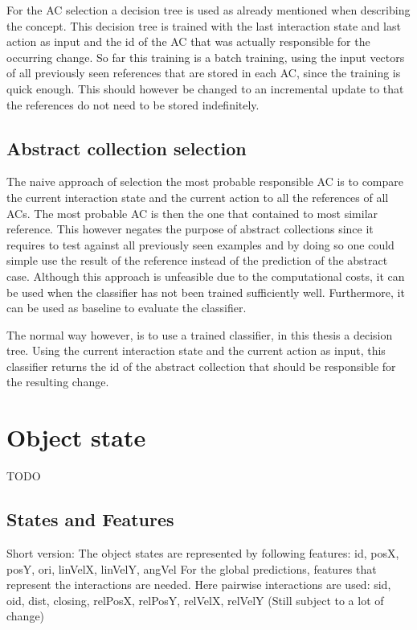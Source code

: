 For the AC selection a decision tree is used as already mentioned when describing the concept. This decision tree is trained with the last interaction state and last action as input and the id of the AC that was actually responsible for the occurring change. So far this training is a batch training, using the input vectors of all previously seen references that are stored in each AC, since the training is quick enough. This should however be changed to an incremental update to that the references do not need to be stored indefinitely.

\subsection{Abstract collection selection\label{sec:acSel}}

The naive approach of selection the most probable responsible AC is to compare the current interaction state and the current action to all the references of all ACs. The most probable AC is then the one that contained to most similar reference. This however negates the purpose of abstract collections since it requires to test against all previously seen examples and by doing so one could simple use the result of the reference instead of the prediction of the abstract case. Although this approach is unfeasible due to the computational costs, it can be used when the classifier has not been trained sufficiently well. Furthermore, it can be used as baseline to evaluate the classifier.
   
The normal way however, is to use a trained classifier, in this thesis a decision tree. Using the current interaction state and the current action as input, this classifier returns the id of the abstract collection that should be responsible for the resulting change.



\section{Object state\label{sec:objectRealization}}
TODO

\subsection{States and Features\label{sec:objectStates}}
Short version:
The object states are represented by following features:
id, posX, posY, ori, linVelX, linVelY, angVel
For the global predictions, features that represent the interactions are 
needed. Here pairwise interactions are used:
sid, oid, dist, closing, relPosX, relPosY, relVelX, relVelY
(Still subject to a lot of change)